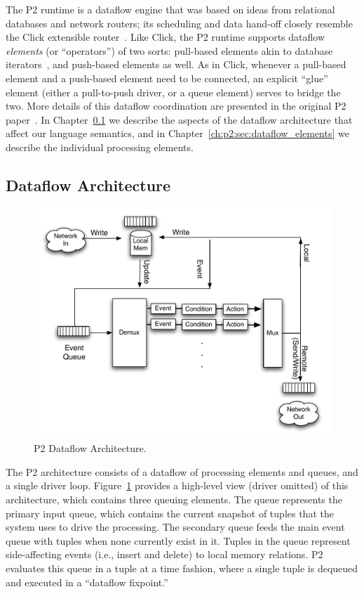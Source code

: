 The P2 runtime is a dataflow engine that was based on ideas from relational
databases and network routers; its scheduling and data hand-off closely
resemble the Click extensible router~\cite{click-tocs}.  Like Click, the P2
runtime supports dataflow {\em elements} (or ``operators'') of two sorts:
pull-based elements akin to database iterators~\cite{graefe-survey}, and
push-based elements as well.  As in Click, whenever a pull-based element and a
push-based element need to be connected, an explicit ``glue'' element (either a
pull-to-push driver, or a queue element) serves to bridge the two.  More
details of this dataflow coordination are presented in the original P2
paper~\cite{p2:sosp}.  In Chapter~\ref{ch:p2:sec:dataflow} we describe the
aspects of the dataflow architecture that affect our language semantics, and in
Chapter~\ref{ch:p2:sec:dataflow_elements} we describe the individual processing
elements.

\subsection{Dataflow Architecture}
\label{ch:p2:sec:dataflow}

\begin{figure} 
\ssp
\begin{center}
\includegraphics[scale=0.6]{figures/p2-arch}
\caption{\label{ch:p2:fig:dataflow}P2 Dataflow Architecture.}
\end{center} 
\end{figure}

The P2 architecture consists of a dataflow of processing elements and queues,
and a single driver loop.  Figure~\ref{ch:p2:fig:dataflow} provides a
high-level view (driver omitted) of this architecture, which contains three
queuing elements.  The  queue represents the primary input queue,
which contains the current snapshot of tuples that the system uses to drive the
processing.  The  secondary queue feeds the main event queue with
tuples when none currently exist in it.  Tuples in the  queue
represent side-affecting events (i.e., insert and delete) to local memory
relations.  P2 evaluates this queue in a tuple at a time fashion, where a
single tuple is dequeued and executed in a ``dataflow fixpoint.''

